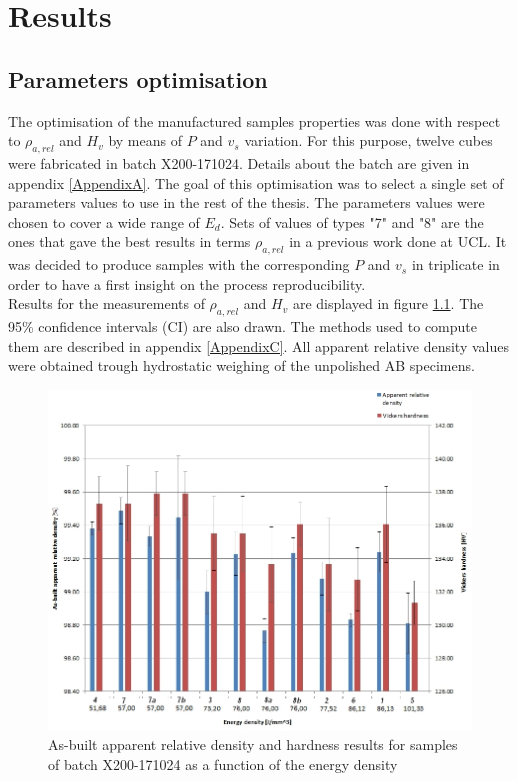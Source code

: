 \chapter{Results}
\label{Chap4}
\section{Parameters optimisation}

The optimisation of the manufactured samples properties was done with respect to $\rho_{a,rel}$ and $H_v$  by means of $P$ and $v_s$ variation. For this purpose, twelve cubes were fabricated in batch X200-171024. Details about the batch are given in appendix \ref{AppendixA}. The goal of this optimisation was to select a single set of parameters values to use in the rest of the thesis. The parameters values were chosen to cover a wide range of $E_d$. Sets of values of types "7" and "8" are the ones that gave the best results in terms $\rho_{a,rel}$ in a previous work done at UCL. It was decided to produce samples with the corresponding $P$ and $v_s$ in triplicate in order to have a first insight on the process reproducibility.\\

Results for the measurements of $\rho_{a,rel}$ and $H_v$ are displayed in figure \ref{fig:HD-171024}. The 95\% confidence intervals (CI) are also drawn. The methods used to compute them are described in appendix \ref{AppendixC}. All apparent relative density values were obtained trough hydrostatic weighing of the unpolished AB specimens.\\

\begin{figure}[ht]
\centering
\centerline{\includegraphics[scale=0.62]{Images/HD-171024}}
\decoRule
\caption[As-built apparent relative density and hardness results for samples of batch X200-171024 as a function of the energy density]{As-built apparent relative density and hardness results for samples of batch X200-171024 as a function of the energy density}
\label{fig:HD-171024}
\end{figure} 

